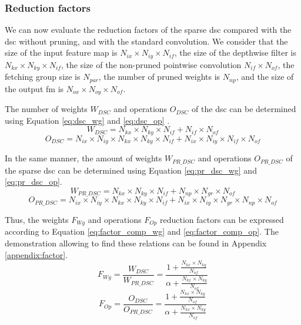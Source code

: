 \subsubsection{Reduction factors}
%
We can now evaluate the reduction factors of the sparse \acrshort{dsc} compared with the \acrshort{dsc} without pruning, and with the standard convolution. We consider that the size of the input feature map is $N_{ix}  \times N_{iy} \times N_{if}$, the size of the depthwise filter is $N_{kx} \times N_{ky} \times N_{if}$, the size of the non-pruned pointwise convolution $N_{if} \times N_{of}$, the fetching group size is $N_{par}$, the number of pruned weights is $N_{np}$, and the size of the output \acrshort{fm} is $N_{ox}  \times N_{oy} \times N_{of}$. 

The number of weights $W_{DSC}$ and operations $O_{DSC}$ of the \acrshort{dsc} can be determined using Equation \eqref{eq:dsc_wg} and \eqref{eq:dsc_op} \cite{liu_fpga-based_2019, bai_cnn_2018}.
%
\begin{equation}
    W_{DSC} = N_{kx} \times N_{ky} \times N_{if} + N_{if} \times N_{of}
    \label{eq:dsc_wg}
\end{equation}
%
\begin{equation}
    O_{DSC} = N_{ix} \times N_{iy} \times N_{kx} \times N_{ky} \times N_{if} + N_{ix} \times N_{iy} \times N_{if} \times N_{of}
    \label{eq:dsc_op}
\end{equation}

In the same manner, the amount of weights $W_{PR\_DSC}$ and operations $O_{PR\_DSC}$ of the sparse \acrshort{dsc} can be determined using Equation \eqref{eq:pr_dsc_wg} and \eqref{eq:pr_dsc_op}.
%
\begin{equation}
    W_{PR\_DSC} = N_{kx} \times N_{ky} \times N_{if} + N_{np} \times N_{gr} \times N_{of}
    \label{eq:pr_dsc_wg}
\end{equation}
%
\begin{equation}
    O_{PR\_DSC} = N_{ix} \times N_{iy} \times N_{kx} \times N_{ky} \times N_{if} + N_{ix} \times N_{iy} \times N_{gr} \times N_{np} \times N_{of}
    \label{eq:pr_dsc_op}
\end{equation}

Thus, the weights $F_{Wg}$ and operations $F_{Op}$ reduction factors can be expressed according to Equation \eqref{eq:factor_comp_wg} and \eqref{eq:factor_comp_op}. The demonstration allowing to find these relations can be found in Appendix \ref{appendix:factor}.
%
\begin{equation}
    F_{Wg} = \frac{W_{DSC}}{W_{PR\_DSC}} = \frac{1 + \frac{N_{kx} \times N_{ky}} {N_{of}}} {\alpha + \frac{N_{kx} \times N_{ky}} {N_{of}}}
    \label{eq:factor_comp_wg}
\end{equation}
\begin{equation}
    F_{Op} = \frac{O_{DSC}}{O_{PR\_DSC}} = \frac{1 + \frac{N_{kx} \times N_{ky}} {N_{of}}} {\alpha + \frac{N_{kx} \times N_{ky}} {N_{of}}}
    \label{eq:factor_comp_op}
\end{equation}


